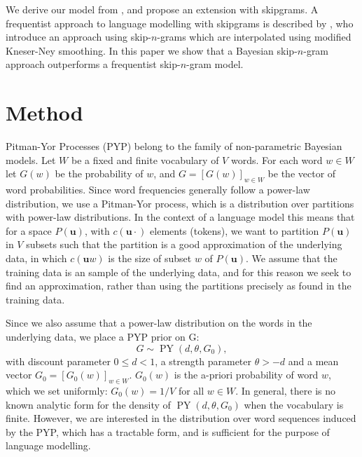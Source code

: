   We derive our model from \textcite{teh2006hierarchical}, and propose an extension with skipgrams. A frequentist approach to language modelling with skipgrams is described by \textcite{pickhardt2014generalized}, who introduce an approach using skip-$n$-grams which are interpolated using modified Kneser-Ney smoothing. In this paper we show that a Bayesian skip-$n$-gram approach outperforms a frequentist skip-$n$-gram model.%

\section{Method}

Pitman-Yor Processes (PYP) belong to the family of non-parametric Bayesian models. Let $W$ be a fixed and finite vocabulary of $V$ words. For each word $w\in W$ let $G(w)$ be the probability of $w$, and $G = [G(w)]_{w\in W}$ be the vector of word probabilities. Since word frequencies generally follow a power-law distribution, we use a Pitman-Yor process, which is a distribution over partitions with power-law distributions. 
In the context of a language model this means that for a space $P(\mathbf{u})$, with $c(\mathbf{u}\cdot)$ elements (tokens), we want to partition $P(\mathbf{u})$ in $V$ subsets such that the partition is a good approximation of the underlying data, in which $c(\mathbf{u}w)$ is the size of subset $w$ of $P(\mathbf{u})$. We assume that the training data is an sample of the underlying data, and for this reason we seek to find an approximation, rather than using the partitions precisely as found in the training data.

Since we also assume that a power-law distribution on the words in the underlying data, we place a PYP prior on G:
  \begin{equation*}
  	G \sim \operatorname{PY}(d,\theta,G_0),
  \end{equation*}
with discount parameter $0\leq d<1$, a strength parameter $\theta > -d$ and a mean vector $G_0 = [G_0(w)]_{w\in W}$. $G_0(w)$ is the a-priori probability of word $w$, which we set uniformly: $G_0(w) = 1/V$ for all $w\in W$. In general, there is no known analytic form for the density of $\operatorname{PY}(d,\theta,G_0)$ when the vocabulary is finite. However, we are interested in the distribution over word sequences induced by the PYP, which has a tractable form, and is sufficient for the purpose of language modelling. 


